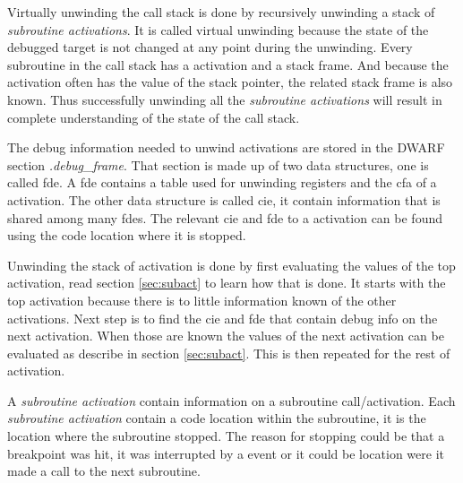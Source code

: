  


Virtually unwinding the call stack is done by recursively unwinding a stack of \emph{subroutine activations}.
It is called virtual unwinding because the state of the debugged target is not changed at any point during the unwinding.
Every subroutine in the call stack has a activation and a stack frame.
And because the activation often has the value of the stack pointer, the related stack frame is also known.
Thus successfully unwinding all the \emph{subroutine activations} will result in complete understanding of the state of the call stack.


The debug information needed to unwind activations are stored in the \gls{DWARF} section \emph{.debug\_frame}.
That section is made up of two data structures, one is called \gls{fde}.
A \gls{fde} contains a table used for unwinding registers and the \gls{cfa} of a activation.
The other data structure is called \gls{cie}, it contain information that is shared among many \glspl{fde}.
The relevant \gls{cie} and \gls{fde} to a activation can be found using the code location where it is stopped.


Unwinding the stack of activation is done by first evaluating the values of the top activation, read section \ref{sec:subact} to learn how that is done.
It starts with the top activation because there is to little information known of the other activations.
Next step is to find the \gls{cie} and \gls{fde} that contain debug info on the next activation.
When those are known the values of the next activation can be evaluated as describe in section \ref{sec:subact}.
This is then repeated for the rest of activation.


 \label{sec:subact}
A \emph{subroutine activation} contain information on a subroutine call/activation.
Each \emph{subroutine activation} contain a code location within the subroutine, it is the location where the subroutine stopped.
The reason for stopping could be that a breakpoint was hit, it was interrupted by a event or it could be location were it made a call to the next subroutine.


